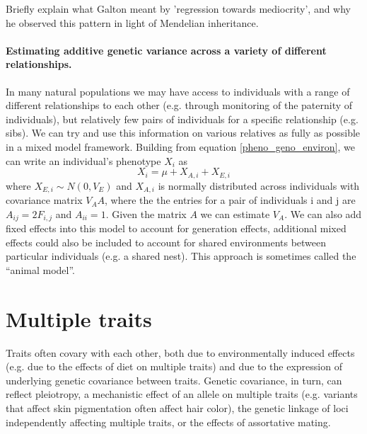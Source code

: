 \begin{question}
Briefly explain what Galton meant by 'regression towards
mediocrity', and why he observed this pattern in light of Mendelian inheritance.
\end{question}

\paragraph{Estimating additive genetic variance across a variety of
  different relationships.}

In many natural populations we may have access to individuals with a
range of different relationships to each other (e.g. through monitoring
of the paternity of individuals), but relatively few pairs of individuals for a specific relationship (e.g. sibs). We can try and use this information on various relatives as
fully as possible in a mixed model framework. Building from equation
\ref{pheno_geno_environ}, we can write an individual's phenotype $X_i$
 as 
\begin{equation}
X_i =  \mu  + X_{A,i} + X_{E,i} 
\end{equation}
where $X_{E,i} \sim N(0,V_E)$  and $X_{A,i}$ is normally distributed across
individuals with covariance matrix $V_A A$, where the the entries for
a pair of individuals i and j are 
$A_{ij}= 2 F_{i,j}$ and $A_{ii}= 1$. Given the matrix $A$ we can estimate $V_A$. We can
also add fixed effects into this model to account for generation
effects, additional mixed effects could also be included to account
for shared environments between particular individuals (e.g. a shared nest).
This approach is sometimes called the ``animal model''. 


\section{Multiple traits}

Traits often covary with each other, both due to environmentally
induced effects (e.g. due to the effects of diet on multiple traits)
and due to the expression of underlying genetic covariance between
traits. Genetic covariance, in turn, can reflect pleiotropy, a
mechanistic effect of an allele on multiple traits (e.g. variants that
affect skin pigmentation often affect hair color), the genetic
linkage of loci independently affecting multiple traits, or the effects of assortative mating. 

